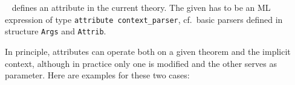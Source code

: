 \begin{isabellebody}
\begin{isamarkuptext}
\begin{description}
  \item \hyperlink{command.attribute-setup}{\mbox{}}~
  defines an attribute in the current theory.  The given  has to be an ML expression of type
  \verb|attribute context_parser|, cf.\ basic parsers defined in
  structure \verb|Args| and \verb|Attrib|.

  In principle, attributes can operate both on a given theorem and the
  implicit context, although in practice only one is modified and the
  other serves as parameter.  Here are examples for these two cases:


\end{description}
\end{isamarkuptext}
\end{isabellebody}
